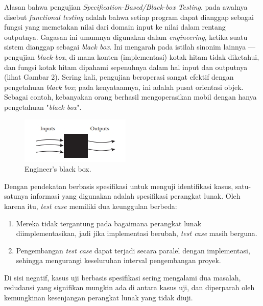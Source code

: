 \documentclass[a4paper,twoside]{article}
\begin{document}
\begin{enumerate}
 
Alasan bahwa pengujian \textit{Specification-Based/Black-box Testing}. pada awalnya disebut \textit{functional testing} adalah bahwa setiap program dapat dianggap sebagai fungsi yang memetakan nilai dari domain input ke nilai dalam rentang outputnya. Gagasan ini umumnya digunakan dalam \textit{engineering}, ketika suatu sistem dianggap sebagai \textit{black box}. Ini mengarah pada istilah sinonim lainnya — pengujian \textit{black-box}, di mana konten (implementasi) kotak hitam tidak diketahui, dan fungsi kotak hitam dipahami sepenuhnya dalam hal input dan outputnya (lihat Gambar 2). Sering kali, pengujian beroperasi sangat efektif dengan pengetahuan \textit{black box}; pada kenyataannya, ini adalah pusat orientasi objek. Sebagai contoh, kebanyakan orang berhasil mengoperasikan mobil dengan hanya pengetahuan "\textit{black box}".
\begin{figure}[h!]
	\includegraphics[scale=1.0]{../DokumenSkripsi/gambar/blackbox}
	\centering
	\caption{Engineer’s black box.}
\end{figure}

Dengan pendekatan berbasis spesifikasi untuk menguji identifikasi kasus, satu-satunya informasi yang digunakan adalah spesifikasi perangkat lunak. Oleh karena itu, \textit{test case} memiliki dua keunggulan berbeda: 
\begin{enumerate}
\item Mereka tidak tergantung pada bagaimana perangkat lunak diimplementasikan, jadi jika implementasi berubah, \textit{test case} masih berguna.
\item Pengembangan \textit{test case} dapat terjadi secara paralel dengan implementasi, sehingga mengurangi keseluruhan interval pengembangan proyek.
\end{enumerate} 
Di sisi negatif, kasus uji berbasis spesifikasi sering mengalami dua masalah, redudansi yang signifikan mungkin ada di antara kasus uji, dan diperparah oleh kemungkinan kesenjangan perangkat lunak yang tidak diuji.


\end{enumerate}
\end{document}
